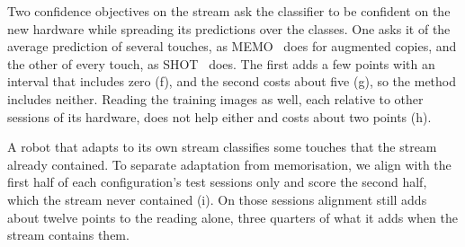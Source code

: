 Two confidence objectives on the stream ask the classifier to be confident on the new hardware while spreading its predictions over the classes. One asks it of the average prediction of several touches, as MEMO~\cite{zhang2022memo} does for augmented copies, and the other of every touch, as SHOT~\cite{liang2020shot} does. The first adds a few points with an interval that includes zero (f), and the second costs about five (g), so the method includes neither. Reading the training images as well, each relative to other sessions of its hardware, does not help either and costs about two points (h).

A robot that adapts to its own stream classifies some touches that the stream already contained. To separate adaptation from memorisation, we align with the first half of each configuration's test sessions only and score the second half, which the stream never contained (i). On those sessions alignment still adds about twelve points to the reading alone, three quarters of what it adds when the stream contains them.

\begin{table}[t]
  \centering\footnotesize\setlength{\tabcolsep}{3pt}
  \caption{\textbf{Other encoders and views} (55 cross-hardware sessions, three seeds). Tube: 192-px crops along the contact, as above. Frame: 384-px crops anywhere in the frame (392\,px for DINOv2). ResNet-50 and ConvNeXt-T start from ImageNet, DINOv2-B from its self-supervised weights, and all are fine-tuned. The CNN, trained from scratch, has four stages (supplement).}
  \label{tab:encoders}
\end{table}

